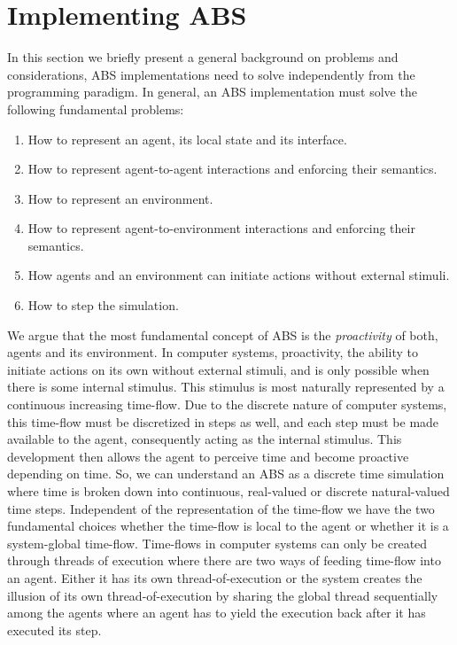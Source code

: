 \section{Implementing ABS}
\label{ch:impl_abs}
In this section we briefly present a general background on problems and considerations, ABS implementations need to solve independently from the programming paradigm. In general, an ABS implementation must solve the following fundamental problems:

\begin{enumerate}
	\item How to represent an agent, its local state and its interface.
	\item How to represent agent-to-agent interactions and enforcing their semantics.
	\item How to represent an environment.
	\item How to represent agent-to-environment interactions and enforcing their semantics.
	\item How agents and an environment can initiate actions without external stimuli.
	\item How to step the simulation.
\end{enumerate}

We argue that the most fundamental concept of ABS is the \textit{proactivity} of both, agents and its environment. In computer systems, proactivity, the ability to initiate actions on its own without external stimuli, and is only possible when there is some internal stimulus. This stimulus is most naturally represented by a continuous increasing time-flow. Due to the discrete nature of computer systems, this time-flow must be discretized in steps as well, and each step must be made available to the agent, consequently acting as the internal stimulus. This development then allows the agent to perceive time and become proactive depending on time. So, we can understand an ABS as a discrete time simulation where time is broken down into continuous, real-valued or discrete natural-valued time steps. Independent of the representation of the time-flow we have the two fundamental choices whether the time-flow is local to the agent or whether it is a system-global time-flow. Time-flows in computer systems can only be created through threads of execution where there are two ways of feeding time-flow into an agent. Either it has its own thread-of-execution or the system creates the illusion of its own thread-of-execution by sharing the global thread sequentially among the agents where an agent has to yield the execution back after it has executed its step. %

